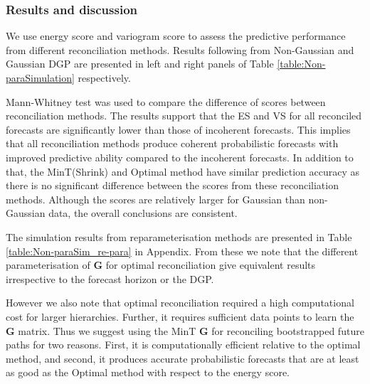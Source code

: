 \documentclass[12pt]{article}
\theoremstyle{definition}
\begin{document}
\subsubsection{Results and discussion}

We use energy score and variogram score to assess the predictive performance from different reconciliation methods. Results following from Non-Gaussian and Gaussian DGP are presented in left and right panels of Table \ref{table:Non-paraSimulation} respectively.

Mann-Whitney test was used to compare the difference of scores between reconciliation methods. The results support that the ES and VS for all reconciled forecasts are significantly lower than those of incoherent forecasts. This implies that all reconciliation methods produce coherent probabilistic forecasts with improved predictive ability compared to the incoherent forecasts. In addition to that, the MinT(Shrink) and Optimal method have similar prediction accuracy as there is no significant difference between the scores from these reconciliation methods. Although the scores are relatively larger for Gaussian than non-Gaussian data, the overall conclusions are consistent. 

The simulation results from reparameterisation methods are presented in Table \ref{table:Non-paraSim_re-para} in Appendix. From these we note that the different parameterisation of $\bm{G}$ for optimal reconciliation give equivalent results irrespective to the forecast horizon or the DGP. 

However we also note that optimal reconciliation required a high computational cost for larger hierarchies. Further, it requires sufficient data points to learn the $\bm{G}$ matrix. Thus we suggest using the MinT $\bm{G}$ for reconciling bootstrapped future paths for two reasons. First, it is computationally efficient relative to the optimal method, and second, it produces accurate probabilistic forecasts that are at least as good as the Optimal method with respect to the energy score.
\end{document}
